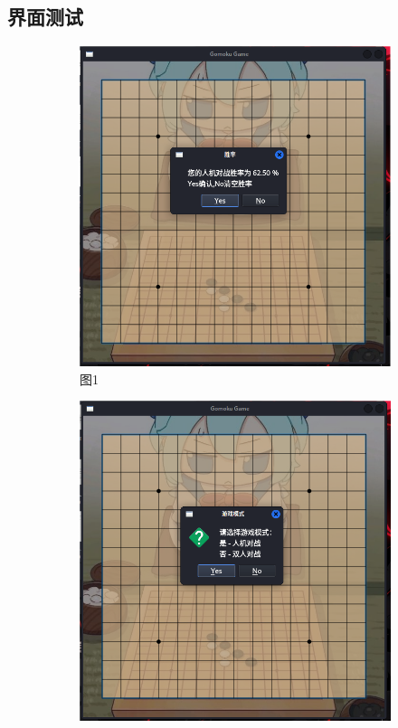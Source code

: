 \documentclass[UTF8]{ctexart}
\begin{document}
\subsection{界面测试}
\begin{figure}[htbp]
    \centering
    \begin{subfigure}[b]{0.3\textwidth}
        \centering
        \includegraphics[width=\textwidth]{screenshoot1.png}
        \caption{图1}
        \label{fig:image1}
    \end{subfigure}%
    \hfill
    \begin{subfigure}[b]{0.3\textwidth}
        \centering
        \includegraphics[width=\textwidth]{screenshoot2.png}

\end{subfigure}
\end{figure}
\end{document}
